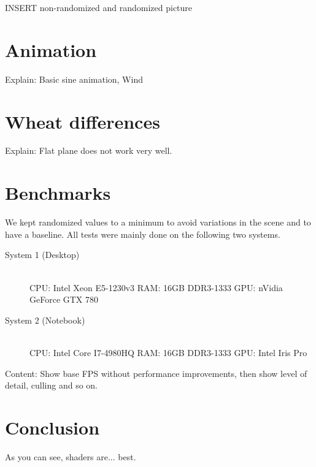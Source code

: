 \documentclass[conference]{acmsiggraph}
\begin{document}
INSERT non-randomized and randomized picture

\section{Animation}
Explain: Basic sine animation, Wind

\section{Wheat differences}
Explain: Flat plane does not work very well.

\section{Benchmarks}
We kept randomized values to a minimum to avoid variations in the scene and to have a baseline. All tests were mainly done on the following two systems.

\begin{flushleft}
\begin{description}
  \item[System 1 (Desktop)] \hfill \\
  CPU: Intel Xeon E5-1230v3 \linebreak
  RAM: 16GB DDR3-1333 \linebreak
  GPU: nVidia GeForce GTX 780
  \item[System 2 (Notebook)] \hfill \\
  CPU: Intel Core I7-4980HQ \linebreak
  RAM: 16GB DDR3-1333 \linebreak
  GPU: Intel Iris Pro
\end{description}
\end{flushleft}

Content: Show base FPS without performance improvements, then show level of detail, culling and so on.

\section{Conclusion}

As you can see, shaders are... best.



\end{document}
